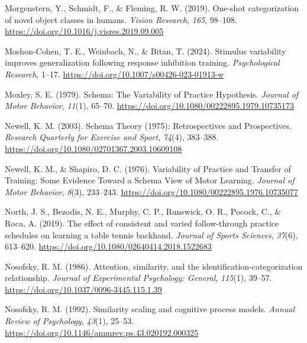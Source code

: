 \documentclass[
  11pt,
  letterpaper,
]{article}
\newlength{\cslhangindent}
\newenvironment{CSLReferences}[2] %
 {\begin{list}{}{%
  \setlength{\itemindent}{0pt}
  \setlength{\leftmargin}{0pt}
  \setlength{\parsep}{0pt}
  \ifodd #1
   \setlength{\leftmargin}{\cslhangindent}
   \setlength{\itemindent}{-1\cslhangindent}
  \fi
  \setlength{\itemsep}{#2\baselineskip}}}
 {\end{list}}
\begin{document}
\begin{CSLReferences}{1}{0}
Morgenstern, Y., Schmidt, F., \& Fleming, R. W. (2019). One-shot
categorization of novel object classes in humans. \emph{Vision
Research}, \emph{165}, 98--108.
\url{https://doi.org/10.1016/j.visres.2019.09.005}

Moshon-Cohen, T. E., Weinbach, N., \& Bitan, T. (2024). Stimulus
variability improves generalization following response inhibition
training. \emph{Psychological Research}, 1--17.
\url{https://doi.org/10.1007/s00426-023-01913-w}

Moxley, S. E. (1979). Schema: {The Variability} of {Practice
Hypothesis}. \emph{Journal of Motor Behavior}, \emph{11}(1), 65--70.
\url{https://doi.org/10.1080/00222895.1979.10735173}

Newell, K. M. (2003). Schema {Theory} (1975): {Retrospectives} and
{Prospectives}. \emph{Research Quarterly for Exercise and Sport},
\emph{74}(4), 383--388.
\url{https://doi.org/10.1080/02701367.2003.10609108}

Newell, K. M., \& Shapiro, D. C. (1976). Variability of {Practice} and
{Transfer} of {Training}: {Some Evidence Toward} a {Schema View} of
{Motor Learning}. \emph{Journal of Motor Behavior}, \emph{8}(3),
233--243. \url{https://doi.org/10.1080/00222895.1976.10735077}

North, J. S., Bezodis, N. E., Murphy, C. P., Runswick, O. R., Pocock,
C., \& Roca, A. (2019). The effect of consistent and varied
follow-through practice schedules on learning a table tennis backhand.
\emph{Journal of Sports Sciences}, \emph{37}(6), 613--620.
\url{https://doi.org/10.1080/02640414.2018.1522683}

Nosofsky, R. M. (1986). Attention, similarity, and the
identification-categorization relationship. \emph{Journal of
Experimental Psychology: General}, \emph{115}(1), 39--57.
\url{https://doi.org/10.1037/0096-3445.115.1.39}

Nosofsky, R. M. (1992). Similarity scaling and cognitive process models.
\emph{Annual Review of Psychology}, \emph{43}(1), 25--53.
\url{https://doi.org/10.1146/annurev.ps.43.020192.000325}


\end{CSLReferences}
\end{document}

